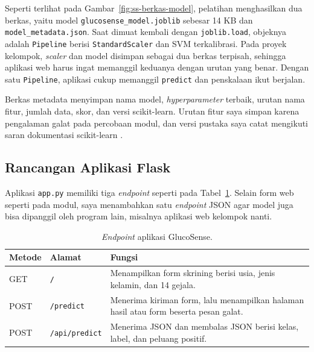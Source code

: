 \documentclass[a4paper,oneside,12pt]{report}
\begin{document}
Seperti terlihat pada Gambar~\ref{fig:ss-berkas-model}, pelatihan menghasilkan dua berkas, yaitu model \texttt{glucosense\_model.joblib} sebesar 14 KB dan \texttt{model\_metadata.json}. Saat dimuat kembali dengan \texttt{joblib.load}, objeknya adalah \texttt{Pipeline} berisi \texttt{StandardScaler} dan SVM terkalibrasi. Pada proyek kelompok, \textit{scaler} dan model disimpan sebagai dua berkas terpisah, sehingga aplikasi web harus ingat memanggil keduanya dengan urutan yang benar. Dengan satu \texttt{Pipeline}, aplikasi cukup memanggil \texttt{predict} dan penskalaan ikut berjalan.

Berkas metadata menyimpan nama model, \textit{hyperparameter} terbaik, urutan nama fitur, jumlah data, skor, dan versi scikit-learn. Urutan fitur saya simpan karena pengalaman galat pada percobaan modul, dan versi pustaka saya catat mengikuti saran dokumentasi scikit-learn \cite{sklearn-persistence}.

\subsection{Rancangan Aplikasi Flask}
Aplikasi \texttt{app.py} memiliki tiga \textit{endpoint} seperti pada Tabel~\ref{tab:endpoint}. Selain form web seperti pada modul, saya menambahkan satu \textit{endpoint} JSON agar model juga bisa dipanggil oleh program lain, misalnya aplikasi web kelompok nanti.

\begin{table}[H]
	\centering
	\caption{\textit{Endpoint} aplikasi GlucoSense.}
	\label{tab:endpoint}
	\small
	\begin{tabularx}{\textwidth}{|l|l|X|}
		\hline
		\textbf{Metode} & \textbf{Alamat}       & \textbf{Fungsi}                                                                 \\
		\hline
		GET             & \texttt{/}            & Menampilkan form skrining berisi usia, jenis kelamin, dan 14 gejala.            \\
		\hline
		POST            & \texttt{/predict}     & Menerima kiriman form, lalu menampilkan halaman hasil atau form beserta pesan galat. \\
		\hline
		POST            & \texttt{/api/predict} & Menerima JSON dan membalas JSON berisi kelas, label, dan peluang positif.       \\
		\hline
	\end{tabularx}
\end{table}
\end{document}
